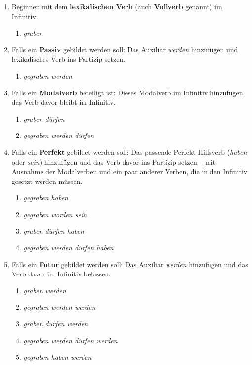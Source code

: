 \begin{enumerate}
  \item Beginnen mit dem \textbf{lexikalischen Verb} (auch \textbf{Vollverb} genannt) im Infinitiv.
    \begin{enumerate}
      \item \textit{graben}
    \end{enumerate} 
  \item Falls ein \textbf{Passiv} gebildet werden soll: Das Auxiliar \textit{werden} hinzufügen und lexikalisches Verb ins Partizip setzen.
    \begin{enumerate}
      \item \textit{gegraben werden}
    \end{enumerate}
  \item Falls ein \textbf{Modalverb} beteiligt ist: Dieses Modalverb im Infinitiv hinzufügen, das Verb davor bleibt im Infinitiv.
    \begin{enumerate}
      \item \textit{graben dürfen}
      \item \textit{gegraben werden dürfen}
    \end{enumerate} 
  \item Falls ein \textbf{Perfekt} gebildet werden soll: Das passende Perfekt-Hilfsverb (\textit{haben} oder \textit{sein}) hinzufügen und das Verb davor ins Partizip setzen -- mit Ausnahme der Modalverben und ein paar anderer Verben, die in den Infinitiv gesetzt werden müssen.
    \begin{enumerate}
      \item \textit{gegraben haben}
      \item \textit{gegraben worden sein}
      \item \textit{graben dürfen haben}
      \item \textit{gegraben werden dürfen haben}
    \end{enumerate} 
  \item Falls ein \textbf{Futur} gebildet werden soll: Das Auxiliar \textit{werden} hinzufügen und das Verb davor im Infinitiv belassen.
    \begin{enumerate}
      \item \textit{graben werden}
      \item \textit{gegraben werden werden}
      \item \textit{graben dürfen werden}
      \item \textit{gegraben werden dürfen werden}
      \item \textit{gegraben haben werden}

\end{enumerate}
\end{enumerate}
